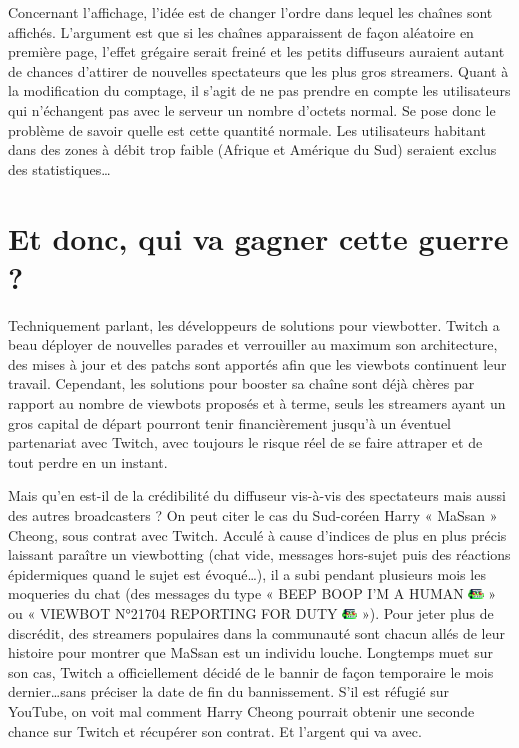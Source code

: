 \documentclass[a4paper]{article}
\begin{document}
Concernant l'affichage, l'idée est de changer l'ordre dans lequel les chaînes sont affichés. L'argument est que si les chaînes apparaissent de façon aléatoire en première page, l'effet grégaire serait freiné et les petits diffuseurs auraient autant de chances d'attirer de nouvelles spectateurs que les plus gros streamers. Quant à la modification du comptage, il s'agit de ne pas prendre en compte les utilisateurs qui n'échangent pas avec le serveur un nombre d'octets normal. Se pose donc le problème de savoir quelle est cette quantité normale. Les utilisateurs habitant dans des zones à débit trop faible (Afrique et Amérique du Sud) seraient exclus des statistiques\ldots

\section{Et donc, qui va gagner cette guerre ?}

Techniquement parlant, les développeurs de solutions pour viewbotter. Twitch a beau déployer de nouvelles parades et verrouiller au maximum son architecture, des mises à jour et des patchs sont apportés afin que les viewbots continuent leur travail. Cependant, les solutions pour booster sa chaîne sont déjà chères par rapport au nombre de viewbots proposés et à terme, seuls les streamers ayant un gros capital de départ pourront tenir financièrement jusqu'à un éventuel partenariat avec Twitch, avec toujours le risque réel de se faire attraper et de tout perdre en un instant.

Mais qu'en est-il de la crédibilité du diffuseur vis-à-vis des spectateurs mais aussi des autres broadcasters ? On peut citer le cas du Sud-coréen Harry « MaSsan » Cheong, sous contrat avec Twitch. Acculé à cause d'indices de plus en plus précis laissant paraître un viewbotting (chat vide, messages hors-sujet puis des réactions épidermiques quand le sujet est évoqué\ldots), il a subi pendant plusieurs mois les moqueries du chat (des messages du type « BEEP BOOP I'M A HUMAN \includegraphics[width=0.4cm]{MrDestructoid.png} » ou « VIEWBOT N°21704 REPORTING FOR DUTY \includegraphics[width=0.4cm]{MrDestructoid.png} »). Pour jeter plus de discrédit, des streamers populaires dans la communauté sont chacun allés de leur histoire pour montrer que MaSsan est un individu louche. Longtemps muet sur son cas, Twitch a officiellement décidé de le bannir de façon temporaire le mois dernier\ldots sans préciser la date de fin du bannissement. S'il est réfugié sur YouTube, on voit mal comment Harry Cheong pourrait obtenir une seconde chance sur Twitch et récupérer son contrat. Et l'argent qui va avec.
\end{document}
